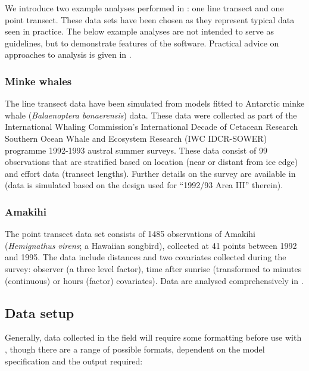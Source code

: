 \documentclass[article,shortnames]{jss}
\begin{document}
We introduce two example analyses performed in : one line
transect and one point transect. These data sets have been chosen as
they represent typical data seen in practice. The below example analyses
are not intended to serve as guidelines, but to demonstrate features of
the software. Practical advice on approaches to analysis is given in
\citet{Thomas:2010cf}.

\subsubsection{Minke whales}\label{minke-whales}

The line transect data have been simulated from models fitted to
Antarctic minke whale (\emph{Balaenoptera bonaerensis}) data. These data
were collected as part of the International Whaling Commission's
International Decade of Cetacean Research Southern Ocean Whale and
Ecosystem Research (IWC IDCR-SOWER) programme 1992-1993 austral summer
surveys. These data consist of 99 observations that are stratified based
on location (near or distant from ice edge) and effort data (transect
lengths). Further details on the survey are available in
\citet{Branch:2001ua} (data is simulated based on the design used for
``1992/93 Area III'' therein).

\subsubsection{Amakihi}\label{amakihi}

The point transect data set consists of 1485 observations of Amakihi
(\emph{Hemignathus virens}; a Hawaiian songbird), collected at 41 points
between 1992 and 1995. The data include distances and two covariates
collected during the survey: observer (a three level factor), time after
sunrise (transformed to minutes (continuous) or hours (factor)
covariates). Data are analysed comprehensively in
\citet{Marques:2007ey}.

\subsection{Data setup}\label{data-setup}

Generally, data collected in the field will require some formatting
before use with , though there are a range of possible
formats, dependent on the model specification and the output required:
\end{document}
